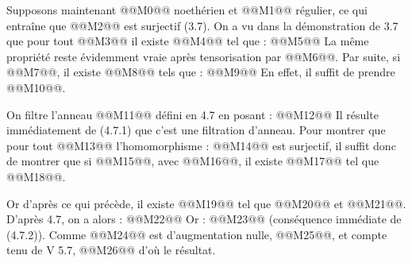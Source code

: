 
Supposons maintenant @@M0@@ noethérien et @@M1@@ régulier, ce qui entraîne que @@M2@@ est surjectif (3.7). On a vu dans la démonstration de 3.7 que pour tout @@M3@@ il existe @@M4@@ tel que :
@@M5@@
La même propriété reste évidemment vraie après tensorisation par @@M6@@. Par suite, si @@M7@@, il existe @@M8@@ tels que :
@@M9@@
En effet, il suffit de prendre @@M10@@.

On filtre l'anneau @@M11@@ défini en 4.7 en posant :
@@M12@@
Il résulte immédiatement de (4.7.1) que c'est une filtration d'anneau. Pour montrer que pour tout @@M13@@ l'homomorphisme :
@@M14@@
est surjectif, il suffit donc de montrer que si @@M15@@, avec @@M16@@, il existe @@M17@@ tel que @@M18@@.

Or d'après ce qui précède, il existe @@M19@@ tel que @@M20@@ et @@M21@@. D'après 4.7, on a alors :
@@M22@@
Or :
@@M23@@
(conséquence immédiate de (4.7.2)). Comme @@M24@@ est d'augmentation nulle, @@M25@@, et compte tenu de V 5.7,
@@M26@@
d'où le résultat.

